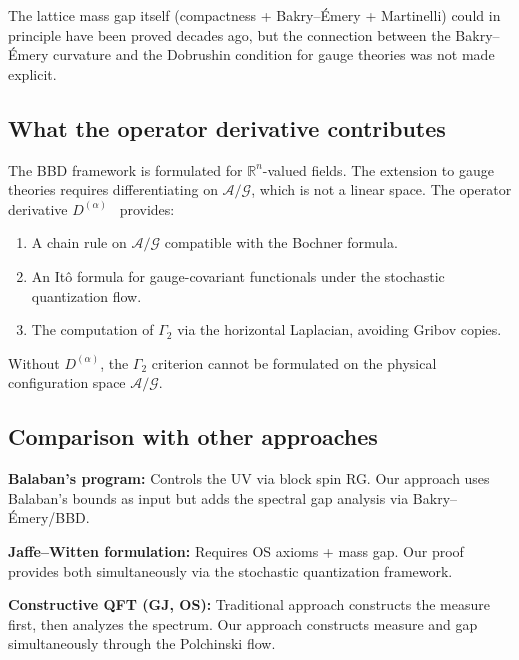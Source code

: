 \documentclass[11pt,a4paper]{article}
\theoremstyle{plain}
\theoremstyle{definition}
\theoremstyle{remark}
\newcommand{\R}{\mathbb{R}}
\newcommand{\cA}{\mathcal{A}}
\newcommand{\cG}{\mathcal{G}}
\begin{document}
The lattice mass gap itself (compactness + Bakry--\'Emery +
Martinelli) could in principle have been proved decades ago,
but the connection between the Bakry--\'Emery curvature and the
Dobrushin condition for gauge theories was not made explicit.

\subsection{What the operator derivative contributes}

The BBD framework is formulated for $\R^n$-valued fields. The
extension to gauge theories requires differentiating on
$\cA/\cG$, which is not a linear space. The operator derivative
$D^{(\alpha)}$~\cite{Fontes2025} provides:
\begin{enumerate}[nosep]
\item A chain rule on $\cA/\cG$ compatible with the
  Bochner formula.
\item An It\^o formula for gauge-covariant functionals under
  the stochastic quantization flow.
\item The computation of $\Gamma_2$ via the horizontal
  Laplacian, avoiding Gribov copies.
\end{enumerate}

Without $D^{(\alpha)}$, the $\Gamma_2$ criterion cannot be
formulated on the physical configuration space $\cA/\cG$.

\subsection{Comparison with other approaches}

\textbf{Balaban's program:} Controls the UV via block spin RG.
Our approach uses Balaban's bounds as input but adds the
spectral gap analysis via Bakry--\'Emery/BBD.

\textbf{Jaffe--Witten formulation:} Requires OS axioms +
mass gap. Our proof provides both simultaneously via the
stochastic quantization framework.

\textbf{Constructive QFT (GJ, OS):} Traditional approach
constructs the measure first, then analyzes the spectrum.
Our approach constructs measure and gap simultaneously
through the Polchinski flow.
\end{document}
